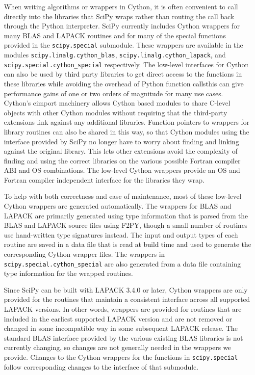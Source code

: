\documentclass[fleqn,10pt]{wlscirep}
\begin{document}
When writing algorithms or wrappers in Cython\cite{behnel2011cython}, it is often convenient to call directly into the libraries that SciPy wraps rather than routing the call back through the Python interpreter.
SciPy currently includes Cython wrappers\cite{blas-lapack-wrappers-scipy-2015} for many BLAS and LAPACK\cite{LAPACK} routines and for many of the special functions provided in the \texttt{scipy.{\allowbreak}special} submodule.
These wrappers are available in the modules \texttt{scipy.{\allowbreak}linalg.{\allowbreak}cython\_blas}, \texttt{scipy.{\allowbreak}linalg.{\allowbreak}cython\_lapack}, and \texttt{scipy.{\allowbreak}special.{\allowbreak}cython\_special} respectively.
The low-level interfaces for Cython can also be used by third party libraries to get direct access to the functions in these libraries while avoiding the overhead of Python function calls{\textemdash}this can give performance gains of one or two orders of magnitude for many use cases.
Cython's cimport machinery allows Cython based modules to share C-level objects with other Cython modules without requiring that the third-party extensions link against any additional libraries.
Function pointers to wrappers for library routines can also be shared in this way, so that Cython modules using the interface provided by SciPy no longer have to worry about finding and linking against the original library.
This lets other extensions avoid the complexity of finding and using the correct libraries on the various possible Fortran compiler ABI and OS combinations.
The low-level Cython wrappers provide an OS and Fortran compiler independent interface for the libraries they wrap.

To help with both correctness and ease of maintenance, most of these low-level Cython wrappers are generated automatically.
The wrappers for BLAS and LAPACK are primarily generated using type information that is parsed from the BLAS and LAPACK source files using F2PY\cite{peterson2009f2py}, though a small number of routines use hand-written type signatures instead.
The input and output types of each routine are saved in a data file that is read at build time and used to generate the corresponding Cython wrapper files.
The wrappers in \texttt{scipy.{\allowbreak}special.{\allowbreak}cython\_special} are also generated from a data file containing type information for the wrapped routines.

Since SciPy can be built with LAPACK 3.4.0 or later, Cython wrappers are only provided for the routines that maintain a consistent interface across all supported LAPACK versions.
In other words, wrappers are provided for routines that are included in the earliest supported LAPACK version and are not removed or changed in some incompatible way in some subsequent LAPACK release.
The standard BLAS interface provided by the various existing BLAS libraries is not currently changing, so changes are not generally needed in the wrappers we provide.
Changes to the Cython wrappers for the functions in \texttt{scipy.{\allowbreak}special} follow corresponding changes to the interface of that submodule.
\end{document}
